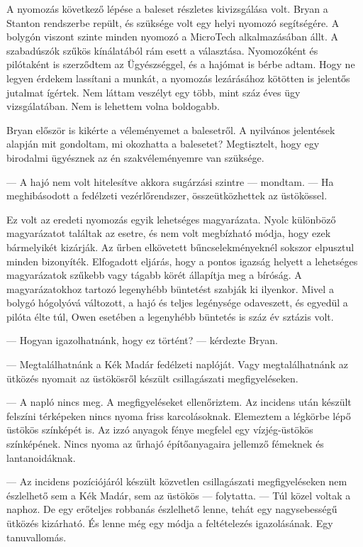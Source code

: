 \documentclass[10pt]{memoir}
\begin{document}
A nyomozás következő lépése a baleset részletes kivizsgálása volt. Bryan a
Stanton rendszerbe repült, és szüksége volt egy helyi nyomozó segítségére. A
bolygón viszont szinte minden nyomozó a MicroTech alkalmazásában állt. A
szabadúszók szűkös kínálatából rám esett a választása. Nyomozóként és
pilótaként is szerződtem az Ügyészséggel, és a hajómat is bérbe adtam. Hogy ne
legyen érdekem lassítani a munkát, a nyomozás lezárásához kötötten is jelentős
jutalmat ígértek. Nem láttam veszélyt egy több, mint száz éves ügy
vizsgálatában. Nem is lehettem volna boldogabb.

Bryan először is kikérte a véleményemet a balesetről. A nyilvános jelentések
alapján mit gondoltam, mi okozhatta a balesetet? Megtisztelt, hogy egy
birodalmi ügyésznek az én szakvéleményemre van szüksége.

--- A hajó nem volt hitelesítve akkora sugárzási szintre --- mondtam. --- Ha
meghibásodott a fedélzeti vezérlőrendszer, összeütközhettek az üstökössel.

Ez volt az eredeti nyomozás egyik lehetséges magyarázata. Nyolc különböző
magyarázatot találtak az esetre, és nem volt megbízható módja, hogy ezek
bármelyikét kizárják. Az űrben elkövetett bűncselekményeknél sokszor elpusztul
minden bizonyíték. Elfogadott eljárás, hogy a pontos igazság helyett a
lehetséges magyarázatok szűkebb vagy tágabb körét állapítja meg a bíróság. A
magyarázatokhoz tartozó legenyhébb büntetést szabják ki ilyenkor. Mivel a
bolygó hógolyóvá változott, a hajó és teljes legénysége odaveszett, és egyedül
a pilóta élte túl, Owen esetében a legenyhébb büntetés is száz év sztázis volt.

--- Hogyan igazolhatnánk, hogy ez történt? --- kérdezte Bryan.

--- Megtalálhatnánk a Kék Madár fedélzeti naplóját. Vagy megtalálhatnánk az
ütközés nyomait az üstökösről készült csillagászati megfigyeléseken.

--- A napló nincs meg. A megfigyeléseket ellenőriztem. Az incidens után készült
felszíni térképeken nincs nyoma friss karcolásoknak. Elemeztem a légkörbe lépő
üstökös színképét is. Az izzó anyagok fénye megfelel egy vízjég-üstökös
színképének. Nincs nyoma az űrhajó építőanyagaira jellemző fémeknek és
lantanoidáknak.

--- Az incidens pozíciójáról készült közvetlen csillagászati megfigyeléseken
nem észlelhető sem a Kék Madár, sem az üstökös --- folytatta. --- Túl közel
voltak a naphoz. De egy erőteljes robbanás észlelhető lenne, tehát egy
nagysebességű ütközés kizárható. És lenne még egy módja a feltételezés
igazolásának. Egy tanuvallomás.
\end{document}
